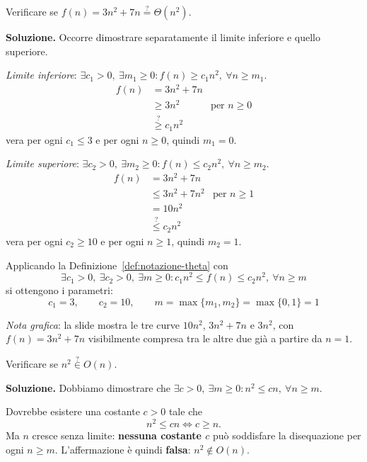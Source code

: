 \documentclass[12pt, a4paper]{article}
\begin{document}
\begin{tcolorbox}[colback=lightergray!10, colframe=tocsec, title=\textbf{Esercizio 2}]
Verificare se $f(n) = 3n^2 + 7n \overset{?}{=} \Theta(n^2)$.
\end{tcolorbox}

\textbf{Soluzione.} Occorre dimostrare separatamente il limite inferiore e quello superiore.

\textit{Limite inferiore}: $\exists c_1 > 0,\ \exists m_1 \ge 0 : f(n) \ge c_1 n^2,\ \forall n \ge m_1$.
\begin{align*}
f(n) &= 3n^2 + 7n \\
     &\ge 3n^2 & \text{per } n \ge 0 \\
     &\overset{?}{\ge} c_1 n^2
\end{align*}
vera per ogni $c_1 \le 3$ e per ogni $n \ge 0$, quindi $m_1 = 0$.

\textit{Limite superiore}: $\exists c_2 > 0,\ \exists m_2 \ge 0 : f(n) \le c_2 n^2,\ \forall n \ge m_2$.
\begin{align*}
f(n) &= 3n^2 + 7n \\
     &\le 3n^2 + 7n^2 & \text{per } n \ge 1 \\
     &= 10n^2 \\
     &\overset{?}{\le} c_2 n^2
\end{align*}
vera per ogni $c_2 \ge 10$ e per ogni $n \ge 1$, quindi $m_2 = 1$.

Applicando la Definizione~\ref{def:notazione-theta} con
$$\exists c_1>0,\ \exists c_2>0,\ \exists m \ge 0 : c_1 n^2 \le f(n) \le c_2 n^2,\ \forall n \ge m$$
si ottengono i parametri:
$$c_1 = 3, \qquad c_2 = 10, \qquad m = \max\{m_1,m_2\} = \max\{0,1\} = 1$$

\textit{Nota grafica}: la slide mostra le tre curve $10n^2$, $3n^2+7n$ e $3n^2$, con $f(n)=3n^2+7n$ visibilmente compresa tra le altre due già a partire da $n=1$.

\begin{tcolorbox}[colback=lightergray!10, colframe=tocsec, title=\textbf{Esercizio 3}]
Verificare se $n^2 \overset{?}{\in} O(n)$.
\end{tcolorbox}

\textbf{Soluzione.} Dobbiamo dimostrare che $\exists c > 0,\ \exists m \ge 0 : n^2 \le cn,\ \forall n \ge m$.

Dovrebbe esistere una costante $c>0$ tale che
$$n^2 \le cn \iff c \ge n.$$
Ma $n$ cresce senza limite: \textbf{nessuna costante $c$} può soddisfare la disequazione per ogni $n \ge m$. L'affermazione è quindi \textcolor{red!70!black}{\textbf{falsa}}: $n^2 \notin O(n)$.
\end{document}
